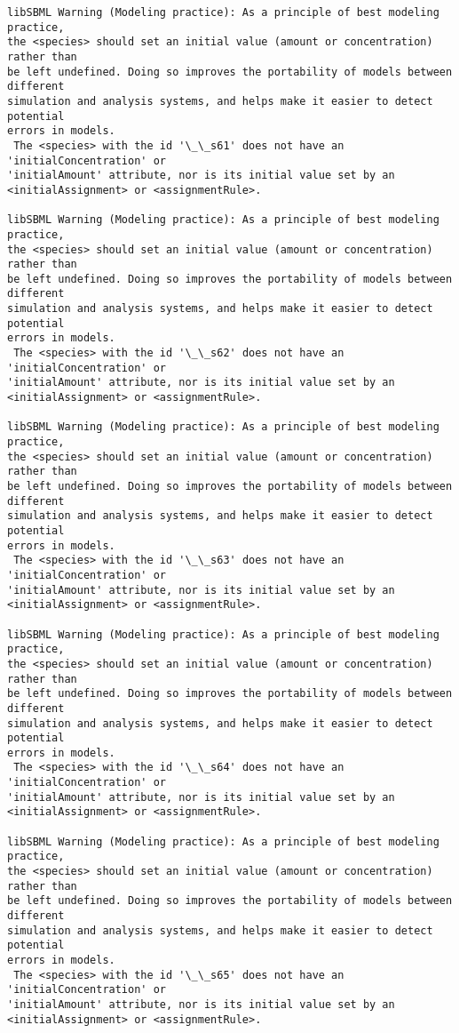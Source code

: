 \documentclass[11pt]{article}
\begin{document}
\begin{Verbatim}[commandchars=\\\{\}]
libSBML Warning (Modeling practice): As a principle of best modeling practice,
the <species> should set an initial value (amount or concentration) rather than
be left undefined. Doing so improves the portability of models between different
simulation and analysis systems, and helps make it easier to detect potential
errors in models.
 The <species> with the id '\_\_s61' does not have an 'initialConcentration' or
'initialAmount' attribute, nor is its initial value set by an
<initialAssignment> or <assignmentRule>.

libSBML Warning (Modeling practice): As a principle of best modeling practice,
the <species> should set an initial value (amount or concentration) rather than
be left undefined. Doing so improves the portability of models between different
simulation and analysis systems, and helps make it easier to detect potential
errors in models.
 The <species> with the id '\_\_s62' does not have an 'initialConcentration' or
'initialAmount' attribute, nor is its initial value set by an
<initialAssignment> or <assignmentRule>.

libSBML Warning (Modeling practice): As a principle of best modeling practice,
the <species> should set an initial value (amount or concentration) rather than
be left undefined. Doing so improves the portability of models between different
simulation and analysis systems, and helps make it easier to detect potential
errors in models.
 The <species> with the id '\_\_s63' does not have an 'initialConcentration' or
'initialAmount' attribute, nor is its initial value set by an
<initialAssignment> or <assignmentRule>.

libSBML Warning (Modeling practice): As a principle of best modeling practice,
the <species> should set an initial value (amount or concentration) rather than
be left undefined. Doing so improves the portability of models between different
simulation and analysis systems, and helps make it easier to detect potential
errors in models.
 The <species> with the id '\_\_s64' does not have an 'initialConcentration' or
'initialAmount' attribute, nor is its initial value set by an
<initialAssignment> or <assignmentRule>.

libSBML Warning (Modeling practice): As a principle of best modeling practice,
the <species> should set an initial value (amount or concentration) rather than
be left undefined. Doing so improves the portability of models between different
simulation and analysis systems, and helps make it easier to detect potential
errors in models.
 The <species> with the id '\_\_s65' does not have an 'initialConcentration' or
'initialAmount' attribute, nor is its initial value set by an
<initialAssignment> or <assignmentRule>.


\end{Verbatim}
\end{document}
